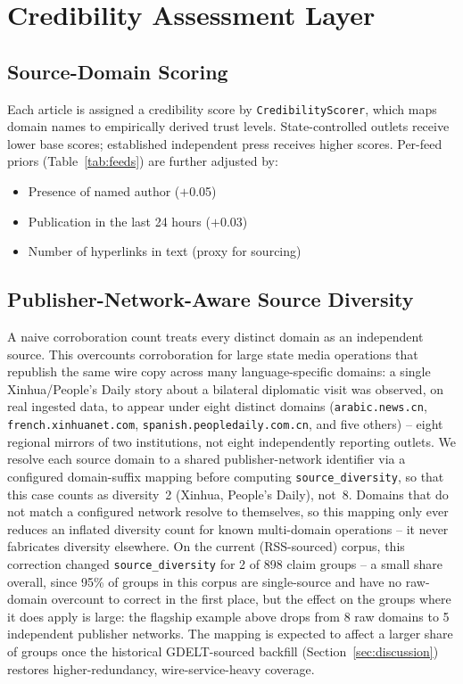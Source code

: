\documentclass[conference]{IEEEtran}
\begin{document}
\section{Credibility Assessment Layer}
\label{sec:credibility}

\subsection{Source-Domain Scoring}

Each article is assigned a credibility score by \texttt{CredibilityScorer},
which maps domain names to empirically derived trust levels. State-controlled
outlets receive lower base scores; established independent press receives
higher scores. Per-feed priors (Table~\ref{tab:feeds}) are further adjusted
by:
\begin{itemize}
  \item Presence of named author ($+$0.05)
  \item Publication in the last 24 hours ($+$0.03)
  \item Number of hyperlinks in text (proxy for sourcing)
\end{itemize}

\subsection{Publisher-Network-Aware Source Diversity}
\label{sec:publisher-networks}

A naive corroboration count treats every distinct domain as an independent
source. This overcounts corroboration for large state media operations that
republish the same wire copy across many language-specific domains: a single
Xinhua/People's Daily story about a bilateral diplomatic visit was observed,
on real ingested data, to appear under eight distinct domains
(\texttt{arabic.news.cn}, \texttt{french.xinhuanet.com},
\texttt{spanish.peopledaily.com.cn}, and five others) -- eight regional
mirrors of two institutions, not eight independently reporting outlets.
We resolve each source domain to a shared publisher-network identifier via a
configured domain-suffix mapping before computing \texttt{source\_diversity},
so that this case counts as diversity~2 (Xinhua, People's Daily), not~8.
Domains that do not match a configured network resolve to themselves, so
this mapping only ever reduces an inflated diversity count for known
multi-domain operations -- it never fabricates diversity elsewhere.
On the current (RSS-sourced) corpus, this correction changed
\texttt{source\_diversity} for 2 of 898 claim groups -- a small share
overall, since 95\% of groups in this corpus are single-source and have no
raw-domain overcount to correct in the first place, but the effect on the
groups where it does apply is large: the flagship example above drops from
8 raw domains to 5 independent publisher networks. The mapping is expected
to affect a larger share of groups once the historical GDELT-sourced
backfill (Section~\ref{sec:discussion}) restores higher-redundancy,
wire-service-heavy coverage.
\end{document}
